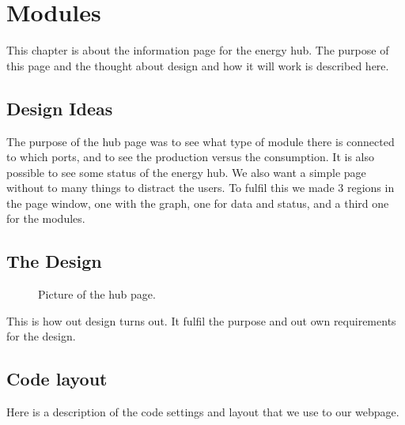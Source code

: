\newpage
\chapter{Modules}
This chapter is about the information page for the energy hub. The purpose of this page and the thought about design and how it will work is described here.
\section{Design Ideas}
The purpose of the hub page was to see what type of module there is connected to which ports, and to see the production versus the consumption. It is also possible to see some status of the energy hub. We also want a simple page without to many things to distract the users. To fulfil this we made 3 regions in the page window, one with the graph, one for data and status, and a third one for the modules.
\section{The Design}

\begin{figure}[h!]
	\center
		\setlength\fboxsep{0pt}
		\setlength\fboxrule{1pt}
   	\caption{Picture of the hub page.}
   	\label{fig:hub_page_design}
\end{figure}
This is how out design turns out. It fulfil the purpose and out own requirements for the design.
\section{Code layout}
Here is a description of the code settings and layout that we use to our webpage.
